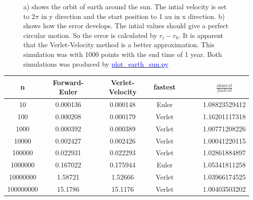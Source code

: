 \begin{figure}[H]
\begin{subfigure}{0.5\textwidth}
        \caption{}
    \end{subfigure}
    \caption{a) shows the orbit of earth around the sun. The intial velocity is set to $2\pi$ in y direction and the start position to 1 au in x direction. b) shows how the error develops. The intial values should give a perfect circular motion. So the error is calculated by $r_i - r_{0}$. It is apparent that the Verlet-Velocity method is a better approximation. This simulation was with 1000 points with the end time of 1 year. Both simulations was produced by \href{https://github.com/erikfsk/Project-3/tree/master/Project3/earth-sun-standard-results}{\textcolor{blue}{plot\_earth\_sun.py}}}
    \label{fig:earth-sun}
\end{figure}


\begin{center}
\label{table:euler-verlet-time}
\begin{tabularx}{\textwidth}{c c c c c c c c}
    \hline 
    \hline 
    n & Forward-Euler & Verlet-Velocity &  fastest &&&& $\frac{slowest}{fastest}$\\ 
    \hline
    10 & 0.000136 & 0.000148 & Euler &&&&   1.08823529412   \\ 
    100 & 0.000208 & 0.000179 & Verlet &&&&   1.16201117318   \\ 
    1000 & 0.000392 & 0.000389 & Verlet &&&&  1.00771208226   \\ 
    10000 & 0.002427 & 0.002426 & Verlet &&&&   1.00041220115  \\ 
    100000 & 0.022931 & 0.022293 & Verlet &&&&   1.02861884897   \\ 
    1000000 & 0.167022 & 0.175944 & Euler &&&&   1.05341811258  \\ 
    10000000 & 1.58721 & 1.52666 & Verlet &&&&   1.03966174525  \\ 
    100000000 & 15.1786 & 15.1176 & Verlet &&&&   1.00403503202  \\ 
    \hline
\end{tabularx}
\end{center}
